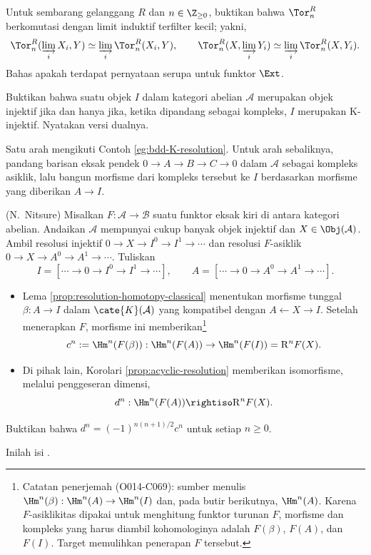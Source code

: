 \begin{Exercises}
	\item Untuk sembarang gelanggang $R$ dan $n\in\Z_{\geq0}$, buktikan bahwa
	$\Tor_n^R$ berkomutasi dengan limit induktif terfilter kecil; yakni,
	\[
		\Tor_n^R(\varinjlim_iX_i,Y)
		\simeq\varinjlim_i\Tor_n^R(X_i,Y),
		\qquad
		\Tor_n^R(X,\varinjlim_iY_i)
		\simeq\varinjlim_i\Tor_n^R(X,Y_i).
	\]
	Bahas apakah terdapat pernyataan serupa untuk funktor $\Ext$.

	\item Buktikan bahwa suatu objek $I$ dalam kategori abelian $\mathcal{A}$
	merupakan objek injektif jika dan hanya jika, ketika dipandang sebagai
	kompleks, $I$ merupakan K-injektif. Nyatakan versi dualnya.
	\begin{hint}
		Satu arah mengikuti Contoh \ref{eg:bdd-K-resolution}. Untuk arah
		sebaliknya, pandang barisan eksak pendek
		$0\to A\to B\to C\to0$ dalam $\mathcal{A}$ sebagai kompleks asiklik,
		lalu bangun morfisme dari kompleks tersebut ke $I$ berdasarkan
		morfisme yang diberikan $A\to I$.
	\end{hint}

	\item (N.\ Nitsure) Misalkan
	$F:\mathcal{A}\to\mathcal{B}$ suatu funktor eksak kiri di antara kategori
	abelian. Andaikan $\mathcal{A}$ mempunyai cukup banyak objek injektif dan
	$X\in\Obj(\mathcal{A})$. Ambil resolusi injektif
	$0\to X\to I^0\to I^1\to\cdots$ dan resolusi $F$-asiklik
	$0\to X\to A^0\to A^1\to\cdots$. Tuliskan
	\[
		I=[\cdots\to0\to I^0\to I^1\to\cdots],
		\qquad
		A=[\cdots\to0\to A^0\to A^1\to\cdots].
	\]
	\begin{itemize}
		\item Lema \ref{prop:resolution-homotopy-classical} menentukan morfisme
		tunggal $\beta:A\to I$ dalam $\cate{K}(\mathcal{A})$ yang kompatibel
		dengan $A\leftarrow X\rightarrow I$. Setelah menerapkan $F$, morfisme
		ini memberikan\footnote{Catatan penerjemah (O014-C069): sumber
		menulis $\Hm^n(\beta):\Hm^n(A)\to\Hm^n(I)$ dan, pada butir berikutnya,
		$\Hm^n(A)$. Karena $F$-asiklikitas dipakai untuk menghitung funktor
		turunan $F$, morfisme dan kompleks yang harus diambil kohomologinya
		adalah $F(\beta)$, $F(A)$, dan $F(I)$. Target memulihkan penerapan
		$F$ tersebut.}
		\[
			c^n:=\Hm^n(F(\beta)):
			\Hm^n(F(A))\to\Hm^n(F(I))=\mathrm{R}^nF(X).
		\]
		\item Di pihak lain, Korolari \ref{prop:acyclic-resolution} memberikan
		isomorfisme, melalui penggeseran dimensi,
		\[
			d^n:\Hm^n(F(A))\rightiso\mathrm{R}^nF(X).
		\]
	\end{itemize}
	Buktikan bahwa
	$d^n=(-1)^{n(n+1)/2}c^n$ untuk setiap $n\geq0$.
	\begin{hint}
		Inilah isi \cite{Ni09}.
	\end{hint}
\end{Exercises}
